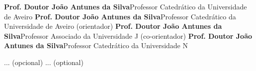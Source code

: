 \TitlePage
  \vspace*{81.5mm}
       {}
       {\textbf{Prof. Doutor João Antunes da Silva}\newline Professor Catedrático da Universidade de Aveiro}
  \vspace*{5mm}
       {\textbf{Prof. Doutor João Antunes da Silva}\newline Professor Catedrático da Universidade de Aveiro (orientador)}
  \vspace*{5mm}
  \TEXT{}
       {\textbf{Prof. Doutor João Antunes da Silva}\newline Professor Associado da Universidade J (co-orientador)}
  \vspace*{5mm}
  \TEXT{}
       {\textbf{Prof. Doutor João Antunes da Silva}\newline Professor Catedrático da Universidade N}
\EndTitlePage


\TitlePage
  \vspace*{81.5mm}
       {... (opcional)}
  \vspace*{12mm}
       {... (optional)}
\EndTitlePage


\TitlePage
  \vspace*{81.5mm}
  \vspace*{12mm}
\EndTitlePage


\TitlePage
  \vspace*{81.5mm}
  \vspace*{12mm}
\EndTitlePage


